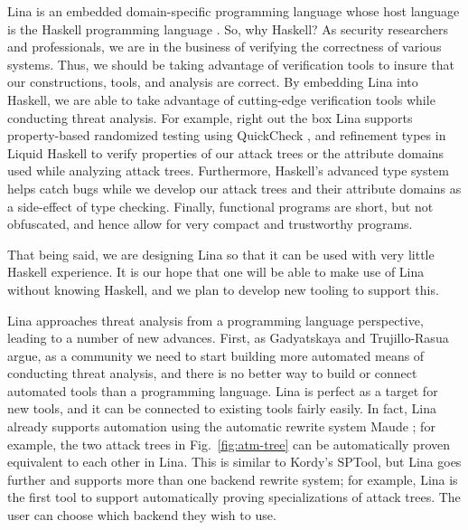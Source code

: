 \documentclass{llncs}
\begin{document}
Lina is an embedded domain-specific programming language whose host
language is the Haskell programming language \cite{jones2003haskell}.
So, why Haskell?  As security researchers and professionals, we are in
the business of verifying the correctness of various systems. Thus, we
should be taking advantage of verification tools to insure that our
constructions, tools, and analysis are correct.  By embedding Lina
into Haskell, we are able to take advantage of cutting-edge
verification tools while conducting threat analysis.  For example,
right out the box Lina supports property-based randomized testing
using QuickCheck \cite{Claessen:2011:QLT:1988042.1988046}, and
refinement types in Liquid Haskell
\cite{Vazou:2014:RTH:2692915.2628161} to verify properties of our
attack trees or the attribute domains used while analyzing attack
trees.  Furthermore, Haskell's advanced type system helps catch bugs
while we develop our attack trees and their attribute domains as a
side-effect of type checking.  Finally, functional programs are short,
but not obfuscated, and hence allow for very compact and trustworthy
programs.

That being said, we are designing Lina so that it can be used with
very little Haskell experience.  It is our hope that one will be able
to make use of Lina without knowing Haskell, and we plan to develop
new tooling to support this.

Lina approaches threat analysis from a programming language
perspective, leading to a number of new advances.  First, as
Gadyatskaya and Trujillo-Rasua \cite{10.1007/978-3-319-74860-3_9}
argue, as a community we need to start building more automated means
of conducting threat analysis, and there is no better way to build or
connect automated tools than a programming language.  Lina is perfect
as a target for new tools, and it can be connected to existing tools
fairly easily.  In fact, Lina already supports automation using the
automatic rewrite system Maude \cite{clavel2005maude}; for example,
the two attack trees in Fig.~\ref{fig:atm-tree} can be automatically
proven equivalent to each other in Lina.  This is similar to Kordy's
\cite{Kordy2017} SPTool, but Lina goes further and supports more than
one backend rewrite system; for example, Lina is the first tool to
support automatically proving specializations of attack trees.  The
user can choose which backend they wish to use.



\vspace{-7px}
\end{document}
